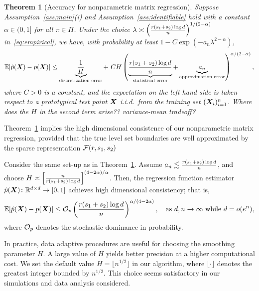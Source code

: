 \documentclass[12pt]{article}
\newcommand*{\KeepStyleUnderBrace}[1]{%
\mathop{%
\mathchoice
{\underbrace{\displaystyle#1}}%
{\underbrace{\textstyle#1}}%
{\underbrace{\scriptstyle#1}}%
{\underbrace{\scriptscriptstyle#1}}%
}\limits
}
\newtheorem{thm}{Theorem}[section]
\begin{document}
\begin{thm}[Accuracy for nonparametric matrix regression]\label{thm:regression}
Suppose Assumption~\ref{ass:main}(i) and Assumption~\ref{ass:identifiable} hold with a constant $\alpha\in(0,1]$ for all $\pi\in\Pi$. Under the choice $\lambda\asymp \left( r(s_1+s_2)\log d \over n\right)^{1/(2-\alpha)}$ in~\eqref{eq:empirical}, we have, with probability at least $1-C\exp(-a_n\lambda^{2-\alpha})$,
\[
\mathbb{E}|\hat p(\mX)- p(\mX)| \leq \KeepStyleUnderBrace{{1\over H}}_{\text{discretization error}} +\ {C H} \left(\KeepStyleUnderBrace{{r(s_1+s_2)\log d\over n}}_{\text{statistical error}} +\KeepStyleUnderBrace{a_n}_{\text{approximation error}}\right)^{\alpha/(2-\alpha)},
\]
where $C>0$ is a constant, and the expectation on the left hand side is taken respect to a prototypical test point $\bm X$ i.i.d.\ from the training set $(\bm X_i)_{i=1}^n$. {\color{red} Where does the $H$ in the second term arise?? variance-mean tradeoff?}
\end{thm}

Theorem~\ref{thm:regression} implies the high dimensional consistence of our nonparametric matrix regression, provided that the true level set boundaries are well approximated by the sparse representation $\mathcal{F}(r,s_1,s_2)$

\begin{corollary} Consider the same set-up as in Theorem~\ref{thm:regression}. Assume $a_n \lesssim {r(s_1+s_2)\log d \over n}$, and choose $H\asymp \left[{n\over r(s_1+s_2) \log d}\right]^{(4-2\alpha)/\alpha}$. Then, the regression function estimator $\hat p(\bm X)\colon \mathbb{R}^{d\times d}\to [0,1]$ achieves high dimensional consistency; that is,
\begin{equation}\label{eq:final}
\mathbb{E}|\hat p(\bm X)- p(\bm X)| \leq \mathcal{O}_p\left({r(s_1+s_2)\log d \over n}\right)^{\alpha/(4-2\alpha)}, \quad \text{as }d, n\to\infty \text{ while } d=o(e^{n}),
\end{equation}
where $\mathcal{O}_p$ denotes the stochastic dominance in probability.
\end{corollary}

In practice, data adaptive procedures are useful for choosing the smoothing parameter $H$. A large value of $H$ yields better precision at a higher computational cost. We set the default value $H= \lfloor n^{1/2}\rfloor$ in our algorithm, where $\lfloor \cdot \rfloor$ denotes the greatest integer bounded by $n^{1/2}$. This choice seems satisfactory in our simulations and data analysis considered. 
\end{document}
